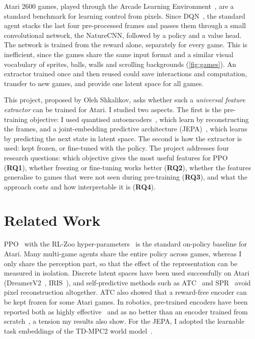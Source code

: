 \documentclass[runningheads]{llncs}
\begin{document}
Atari 2600 games, played through the Arcade Learning Environment~\cite{machado2018revisiting},
are a standard benchmark for learning control from pixels. Since
DQN~\cite{mnih2015human}, the standard agent stacks the last four pre-processed frames and
passes them through a small convolutional network, the NatureCNN, followed by a policy and a
value head. The network is trained from the reward alone, separately for every game. This is
inefficient, since the games share the same input
format and a similar visual vocabulary of sprites, balls, walls and scrolling backgrounds
(\cref{fig:games}). An extractor trained once and then reused could save interactions and computation,
transfer to new games, and provide one latent space for all games.

This project, proposed by Oleh Shkalikov, asks whether such a \emph{universal feature
extractor} can be trained for Atari. I studied two aspects. The first is the pre-training objective: I used quantised
autoencoders~\cite{vandenoord2017vqvae,mentzer2024fsq}, which learn by reconstructing the
frames, and a joint-embedding predictive architecture
(JEPA)~\cite{lecun2022path,assran2023ijepa,bardes2024vjepa}, which learns by predicting the
next state in latent space. The second is how the extractor is used: kept frozen, or fine-tuned with the policy. The
project addresses four research questions: which objective gives the most useful features for PPO (\textbf{RQ1}), whether
freezing or fine-tuning works better (\textbf{RQ2}), whether the features generalise to games
that were not seen during pre-training (\textbf{RQ3}), and what the approach costs and
how interpretable it is (\textbf{RQ4}).

\section{Related Work}
\label{sec:related}

PPO~\cite{schulman2017ppo} with the RL-Zoo hyper-parameters~\cite{raffin2020zoo} is the
standard on-policy baseline for Atari. Many multi-game agents share the entire policy across games, whereas I only share the
perception part, so that the effect of the representation can be measured in isolation. Discrete latent spaces have been used
successfully on Atari (DreamerV2~\cite{hafner2021dreamerv2}, IRIS~\cite{micheli2023iris}), and
self-predictive methods such as ATC~\cite{stooke2021atc} and SPR~\cite{schwarzer2021spr} avoid
pixel reconstruction altogether. ATC also showed that a reward-free encoder can be kept frozen for some Atari games. In robotics, pre-trained encoders have been reported both
as highly effective~\cite{parisi2022pvr} and as no better than an encoder trained from
scratch~\cite{hansen2022pretrained}, a tension my results also show. For the JEPA, I
adopted the learnable task embeddings of the TD-MPC2 world model~\cite{hansen2024tdmpc2}.
\end{document}
